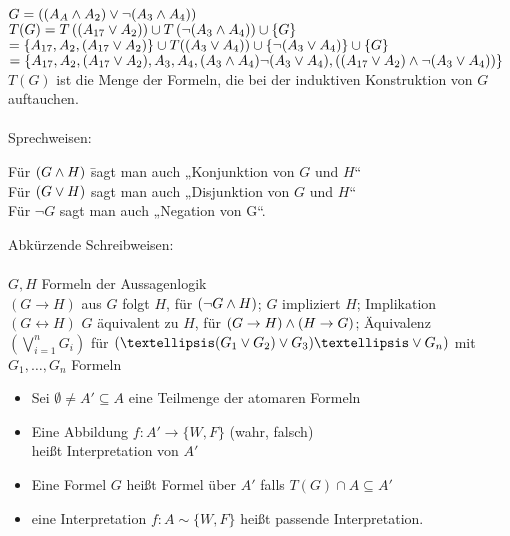 \beispiel{}
$G= \left( (A_A \wedge A_2) \vee \neg (A_3 \wedge A_4) \right)$\\
$T(G) = T \left( (A_{17} \vee A_2) \right) \cup T \left(\neg ( A_3 \wedge A_4) \right) \cup \{G\}$\\
$= \{ A_{17}, A_2, (A_{17} \vee A_2) \} \cup T((A_3 \vee A_4)) \cup \{ \neg (A_3 \vee A_4) \} \cup \{G\}$\\
$= \{A_{17}, A_2, (A_{17} \vee A_2), A_3, A_4, (A_3 \wedge A_4) \neg (A_3 \vee A_4), \left( (A_{17} \vee A_2) \wedge \neg (A_3 \vee A_4) \right) \}$\\
    
\beweis{}
$T(G)$ ist die Menge der Formeln, die bei der induktiven Konstruktion von $G$ auftauchen.\\
\noindent\\
Sprechweisen:
\begin{tabbing}
Für $(G \wedge H)$ \= sagt man auch „Konjunktion von $G$ und $H$“\\
Für $(G \vee H)$ \> sagt man auch „Disjunktion von $G$ und $H$“\\
Für $\neg G$ \> sagt man auch „Negation von G“.\\
\end{tabbing}

\noindent
Abkürzende Schreibweisen:\\
\noindent\\
$G, H$ Formeln der Aussagenlogik\\
$(G \rightarrow H)$ aus $G$ folgt $H$, für $(\neg G \wedge H)$; $G$ impliziert $H$; Implikation\\
$(G \leftrightarrow H)$ $G$ äquivalent zu $H$, für $(G \rightarrow H) \wedge (H \rightarrow G)$; Äquivalenz\\
$( \bigvee_{i=1}^{n} G_i )$ für $\left( … (G_1 \OR G_2) \OR G_3 ) … \OR G_n \right)$ \hspace{1cm}mit $G_1, …, G_n$ Formeln\\

\begin{itemize}
\item Sei $\emptyset \neq A' \subseteq A$ eine Teilmenge der atomaren Formeln
\item Eine Abbildung $f: A' \rightarrow \{W,F\}$ (wahr, falsch)\\
    heißt Interpretation von $A'$
\item Eine Formel $G$ heißt Formel über $A'$ falls $T(G) \cap A \subseteq A'$
\item eine Interpretation $f: A \sim \{W, F\}$ heißt passende Interpretation.\\
\end{itemize}